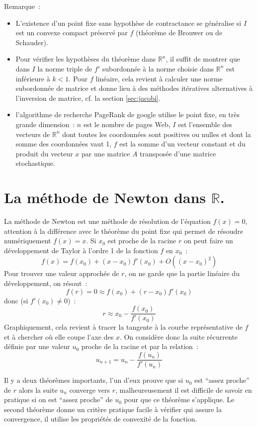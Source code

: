 \documentclass[a4paper,11pt]{book}
\begin{document}
\begin{giacjshere}
Remarque~: 
\begin{itemize}
\item L'existence d'un point fixe sans hypoth\`ese de contractance
se g\'en\'eralise si $I$ est un convexe compact pr\'eserv\'e
par $f$ (th\'eor\`eme
de Brouwer ou de Schauder).
\item Pour v\'erifier les hypoth\`eses du th\'eor\`eme dans
$\mathbb{R}^n$, il suffit de montrer que dans $I$ la norme triple de $f'$
subordonn\'ee \`a la norme choisie dans $\mathbb{R}^n$ est inf\'erieure
\`a $k<1$. Pour $f$ lin\'eaire,
cela revient \`a calculer une norme subordonn\'ee de matrice
et donne lieu \`a des m\'ethodes it\'eratives alternatives \`a
l'inversion de matrice, cf. la section \ref{sec:jacobi}.
\item l'algorithme de recherche
PageRank de google utilise le point fixe, en tr\`es grande dimension~:
$n$ est le nombre de pages Web, $I$ est l'ensemble des vecteurs
de $\mathbb{R}^n$ dont toutes les coordonn\'ees sont positives ou nulles et
dont la somme des coordonn\'ees vaut 1, $f$ est la somme d'un vecteur
constant et du produit du vecteur $x$ par une matrice $A$ transpos\'ee
d'une matrice stochastique.
\end{itemize}

\section{La méthode de Newton dans $\mathbb{R}$.}
La méthode de Newton est une méthode de résolution de l'équation
$f(x)=0$, attention à la différence avec le théorème du point fixe
qui permet de résoudre numériquement $f(x)=x$.
Si $x_0$ est proche de la racine $r$
on peut faire un développement de Taylor à l'ordre 1 de la
fonction $f$ en $x_0$~:
\[ f(x)=f(x_0)+(x-x_0)f'(x_0)+O((x-x_0)^2) \]
Pour trouver une valeur approchée de $r$, on ne garde que la partie
linéaire du développement, on résout~:
\[ f(r)=0 \approx f(x_0) + (r-x_0) f'(x_0) \]
donc (si $f'(x_0)\neq 0$)~:
\[ r \approx x_0 -\frac{f(x_0)}{f'(x_0)}\]
Graphiquement, cela revient à tracer la tangente à la courbe représentative
de $f$ et à chercher où elle coupe l'axe des $x$.
On considère donc la suite récurrente définie par une valeur $u_0$
proche de la racine et par la relation~:
\[ u_{n+1} = u_n -\frac{f(u_n)}{f'(u_n)}\]

Il y a deux théorèmes importants, l'un d'eux prouve que
si $u_0$ est ``assez proche'' de $r$ alors la suite $u_n$ converge vers $r$,
malheureusement il est difficile de savoir en pratique si on est 
``assez proche'' de $u_0$ pour que ce théorème s'applique. Le second
théorème donne un critère pratique facile à vérifier qui assure
la convergence, il utilise les propriétés de convexité de la fonction.


\end{giacjshere}
\end{document}
